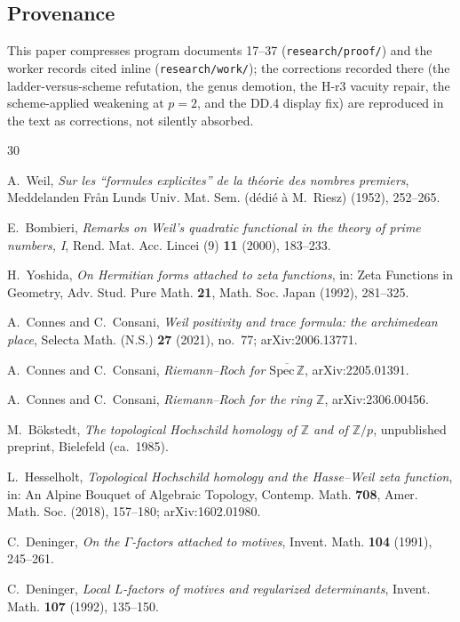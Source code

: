 \documentclass[11pt,reqno]{amsart}
\theoremstyle{plain}
\theoremstyle{definition}
\theoremstyle{remark}
\newcommand{\Z}{\mathbb{Z}}
\begin{document}
\subsection*{Provenance}
This paper compresses program documents 17--37 (\texttt{research/proof/}) and the worker
records cited inline (\texttt{research/work/}); the corrections recorded there (the
ladder-versus-scheme refutation, the genus demotion, the H-r3 vacuity repair, the
scheme-applied weakening at $p = 2$, and the DD.4 display fix) are reproduced in the text as
corrections, not silently absorbed.

\begin{thebibliography}{30}

 A.~Weil, \emph{Sur les ``formules explicites'' de la th\'eorie des nombres
premiers}, Meddelanden Fr\aa n Lunds Univ. Mat. Sem. (d\'edi\'e \`a M.~Riesz) (1952), 252--265.

 E.~Bombieri, \emph{Remarks on Weil's quadratic functional in the theory
of prime numbers, I}, Rend. Mat. Acc. Lincei (9) \textbf{11} (2000), 183--233.

 H.~Yoshida, \emph{On Hermitian forms attached to zeta functions}, in:
Zeta Functions in Geometry, Adv. Stud. Pure Math. \textbf{21}, Math. Soc. Japan (1992), 281--325.

 A.~Connes and C.~Consani, \emph{Weil positivity and trace formula: the
archimedean place}, Selecta Math. (N.S.) \textbf{27} (2021), no.~77; arXiv:2006.13771.

 A.~Connes and C.~Consani, \emph{Riemann--Roch for $\overline{\mathrm{Spec}\,\Z}$},
arXiv:2205.01391.

 A.~Connes and C.~Consani, \emph{Riemann--Roch for the ring $\Z$},
arXiv:2306.00456.

 M.~B\"okstedt, \emph{The topological Hochschild homology of $\Z$ and of
$\Z/p$}, unpublished preprint, Bielefeld (ca.~1985).

 L.~Hesselholt, \emph{Topological Hochschild homology and the Hasse--Weil
zeta function}, in: An Alpine Bouquet of Algebraic Topology, Contemp. Math. \textbf{708},
Amer. Math. Soc. (2018), 157--180; arXiv:1602.01980.

 C.~Deninger, \emph{On the $\Gamma$-factors attached to motives},
Invent. Math. \textbf{104} (1991), 245--261.

 C.~Deninger, \emph{Local $L$-factors of motives and regularized
determinants}, Invent. Math. \textbf{107} (1992), 135--150.


\end{thebibliography}
\end{document}
